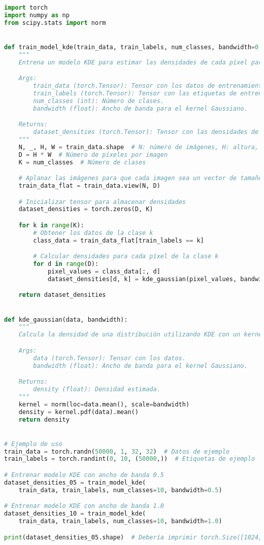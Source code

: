 \documentclass[spanish]{article}
\begin{document}
\begin{lstlisting}[language=Python, caption=Implementacion Train Model KDE]
import torch
import numpy as np
from scipy.stats import norm


def train_model_kde(train_data, train_labels, num_classes, bandwidth=0.5):
    """
    Entrena un modelo KDE para estimar las densidades de cada píxel para cada clase.

    Args:
        train_data (torch.Tensor): Tensor con los datos de entrenamiento de forma [N, 1, 32, 32].
        train_labels (torch.Tensor): Tensor con las etiquetas de entrenamiento de forma [N].
        num_classes (int): Número de clases.
        bandwidth (float): Ancho de banda para el kernel Gaussiano.

    Returns:
        dataset_densities (torch.Tensor): Tensor con las densidades de cada píxel para cada clase de forma [D, K].
    """
    N, _, H, W = train_data.shape  # N: número de imágenes, H: altura, W: anchura
    D = H * W  # Número de píxeles por imagen
    K = num_classes  # Número de clases

    # Aplanar las imágenes para que cada imagen sea un vector de tamaño D
    train_data_flat = train_data.view(N, D)

    # Inicializar tensor para almacenar densidades
    dataset_densities = torch.zeros(D, K)

    for k in range(K):
        # Obtener los datos de la clase k
        class_data = train_data_flat[train_labels == k]

        # Calcular densidades para cada píxel de la clase k
        for d in range(D):
            pixel_values = class_data[:, d]
            dataset_densities[d, k] = kde_gaussian(pixel_values, bandwidth)

    return dataset_densities


def kde_gaussian(data, bandwidth):
    """
    Calcula la densidad de una distribución utilizando KDE con un kernel Gaussiano.

    Args:
        data (torch.Tensor): Tensor con los datos.
        bandwidth (float): Ancho de banda para el kernel Gaussiano.

    Returns:
        density (float): Densidad estimada.
    """
    kernel = norm(loc=data.mean(), scale=bandwidth)
    density = kernel.pdf(data).mean()
    return density


# Ejemplo de uso
train_data = torch.randn(50000, 1, 32, 32)  # Datos de ejemplo
train_labels = torch.randint(0, 10, (50000,))  # Etiquetas de ejemplo

# Entrenar modelo KDE con ancho de banda 0.5
dataset_densities_05 = train_model_kde(
    train_data, train_labels, num_classes=10, bandwidth=0.5)

# Entrenar modelo KDE con ancho de banda 1.0
dataset_densities_10 = train_model_kde(
    train_data, train_labels, num_classes=10, bandwidth=1.0)

print(dataset_densities_05.shape)  # Debería imprimir torch.Size([1024, 10])
\end{lstlisting}
\end{document}
